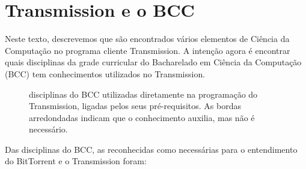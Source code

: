 
\chapter{Transmission e o BCC}
\label{chap:bcc}

Neste texto, descrevemos que são encontrados vários elementos de Ciência da Computação
no programa cliente Transmission. A intenção agora é encontrar quais disciplinas da
grade curricular do Bacharelado em Ciência da Computação (BCC) tem conhecimentos
utilizados no Transmission.

\begin{figure}[H]
    \centering
    \caption{disciplinas do BCC utilizadas diretamente na programação do Transmission, ligadas pelos seus pré-requisitos. As bordas arredondadas indicam que o conhecimento auxilia, mas não é necessário.}
    \label{fig:bcc}
\end{figure}

Das disciplinas do BCC, as reconhecidas como necessárias para o entendimento do
BitTorrent e o Transmission foram:

